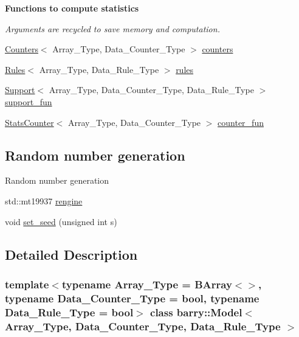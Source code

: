 \begin{Indent}\textbf{ Functions to compute statistics}\par
{\em Arguments are recycled to save memory and computation. }\begin{DoxyCompactItemize}
\item 
\hyperlink{classbarry_1_1_counters}{Counters}$<$ Array\+\_\+\+Type, Data\+\_\+\+Counter\+\_\+\+Type $>$ \hyperlink{classbarry_1_1_model_aea013a7ac325ece7564e8ea9cdf441a2}{counters}
\item 
\hyperlink{classbarry_1_1_rules}{Rules}$<$ Array\+\_\+\+Type, Data\+\_\+\+Rule\+\_\+\+Type $>$ \hyperlink{classbarry_1_1_model_a53e5242ce0ed2bc7194a0662d09493f2}{rules}
\item 
\hyperlink{classbarry_1_1_support}{Support}$<$ Array\+\_\+\+Type, Data\+\_\+\+Counter\+\_\+\+Type, Data\+\_\+\+Rule\+\_\+\+Type $>$ \hyperlink{classbarry_1_1_model_afd005aae0fdd12a8c68d1fd8823b3727}{support\+\_\+fun}
\item 
\hyperlink{classbarry_1_1_stats_counter}{Stats\+Counter}$<$ Array\+\_\+\+Type, Data\+\_\+\+Counter\+\_\+\+Type $>$ \hyperlink{classbarry_1_1_model_ada40ca4ec8b21a3dbbe646edbfb1df45}{counter\+\_\+fun}
\end{DoxyCompactItemize}
\end{Indent}
\subsection*{Random number generation}
\label{_amgrp9e5d9cca94c03e04e66d088f8628d19b}%
Random number generation \begin{DoxyCompactItemize}
\item 
std\+::mt19937 \hyperlink{classbarry_1_1_model_af7ba92e1910b1b19b1a4d7436f1aa19b}{rengine}
\item 
void \hyperlink{classbarry_1_1_model_a175a1772d843dedd603f6bb572cfa30a}{set\+\_\+seed} (unsigned int s)
\end{DoxyCompactItemize}


\subsection{Detailed Description}
\subsubsection*{template$<$typename Array\+\_\+\+Type = B\+Array$<$$>$, typename Data\+\_\+\+Counter\+\_\+\+Type = bool, typename Data\+\_\+\+Rule\+\_\+\+Type = bool$>$\newline
class barry\+::\+Model$<$ Array\+\_\+\+Type, Data\+\_\+\+Counter\+\_\+\+Type, Data\+\_\+\+Rule\+\_\+\+Type $>$}

